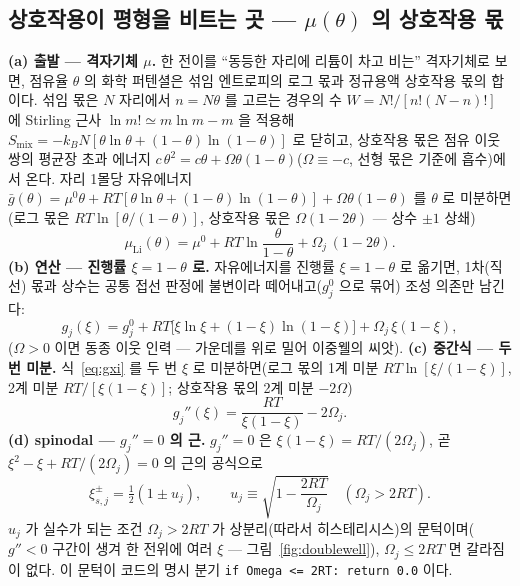 \documentclass[11pt,a4paper]{article}
\newcommand{\code}[1]{\texttt{#1}}
\begin{document}
\subsection{상호작용이 평형을 비트는 곳 — $\mu(\theta)$ 의 상호작용 몫}
\textbf{(a) 출발 — 격자기체 $\mu$.} 한 전이를 ``동등한 자리에 리튬이 차고 비는'' 격자기체로 보면, 점유율 $\theta$ 의 화학
퍼텐셜은 섞임 엔트로피의 로그 몫과 정규용액 상호작용 몫의 합이다. 섞임 몫은 $N$ 자리에서 $n=N\theta$ 를 고르는 경우의
수 $W=N!/[n!(N-n)!]$ 에 Stirling 근사 $\ln m!\simeq m\ln m-m$ 을 적용해
$S_\mathrm{mix}=-k_BN[\theta\ln\theta+(1-\theta)\ln(1-\theta)]$ 로 닫히고, 상호작용 몫은 점유 이웃 쌍의 평균장 초과
에너지 $c\,\theta^2=c\theta+\Omega\theta(1-\theta)$($\Omega\equiv-c$, 선형 몫은 기준에 흡수)에서 온다. 자리 1몰당
자유에너지 $\bar g(\theta)=\mu^0\theta+RT[\theta\ln\theta+(1-\theta)\ln(1-\theta)]+\Omega\theta(1-\theta)$ 를
$\theta$ 로 미분하면(로그 몫은 $RT\ln[\theta/(1-\theta)]$, 상호작용 몫은 $\Omega(1-2\theta)$ — 상수 $\pm1$ 상쇄)
\begin{equation}
\mu_\mathrm{Li}(\theta)=\mu^0+RT\ln\frac{\theta}{1-\theta}+\Omega_j\,(1-2\theta).
\label{eq:mu}
\end{equation}
\textbf{(b) 연산 — 진행률 $\xi=1-\theta$ 로.} 자유에너지를 진행률 $\xi=1-\theta$ 로 옮기면, 1차(직선) 몫과 상수는
공통 접선 판정에 불변이라 떼어내고($g_j^0$ 으로 묶어) 조성 의존만 남긴다:
\begin{equation}
g_j(\xi)=g_j^0+RT\big[\xi\ln\xi+(1-\xi)\ln(1-\xi)\big]+\Omega_j\,\xi(1-\xi),
\label{eq:gxi}
\end{equation}
($\Omega>0$ 이면 동종 이웃 인력 — 가운데를 위로 밀어 이중웰의 씨앗). \textbf{(c) 중간식 — 두 번 미분.}
식~\eqref{eq:gxi} 를 두 번 $\xi$ 로 미분하면(로그 몫의 1계 미분 $RT\ln[\xi/(1-\xi)]$, 2계 미분
$RT/[\xi(1-\xi)]$; 상호작용 몫의 2계 미분 $-2\Omega$)
\begin{equation}
g_j''(\xi)=\frac{RT}{\xi(1-\xi)}-2\Omega_j.
\label{eq:gpp}
\end{equation}
\textbf{(d) spinodal — $g_j''=0$ 의 근.} $g_j''=0$ 은 $\xi(1-\xi)=RT/(2\Omega_j)$, 곧 $\xi^2-\xi+RT/(2\Omega_j)=0$
의 근의 공식으로
\begin{equation}
\xi_{s,j}^\pm=\tfrac12(1\pm u_j),\qquad
u_j\equiv\sqrt{1-\frac{2RT}{\Omega_j}}\quad(\Omega_j>2RT).
\label{eq:spinodal}
\end{equation}
$u_j$ 가 실수가 되는 조건 $\Omega_j>2RT$ 가 상분리(따라서 히스테리시스)의 문턱이며($g''<0$ 구간이 생겨 한 전위에 여러
$\xi$ — 그림~\ref{fig:doublewell}), $\Omega_j\le2RT$ 면 갈라짐이 없다. 이 문턱이 코드의 명시 분기
\code{if Omega <= 2RT: return 0.0} 이다.
\end{document}
